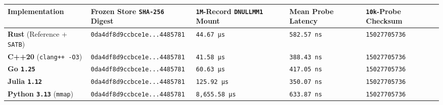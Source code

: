 \documentclass[10pt,letterpaper]{article}
\newcounter{none}
\begin{document}
{\def\LTcaptype{none} %
{\footnotesize\setlength{\tabcolsep}{3.8pt}\renewcommand{\arraystretch}{1.15}
\begin{longtable}[]{@{}
  >{\raggedright\arraybackslash}p{}
  >{\raggedright\arraybackslash}p{}
  >{\raggedleft\arraybackslash}p{}
  >{\raggedleft\arraybackslash}p{}
  >{\raggedleft\arraybackslash}p{}@{}}
\toprule\noalign{}
\begin{minipage}[b]{\linewidth}\raggedright
\textbf{Implementation}
\end{minipage} & \begin{minipage}[b]{\linewidth}\raggedright
\textbf{Frozen Store \texttt{SHA-256} Digest}
\end{minipage} & \begin{minipage}[b]{\linewidth}\raggedleft
\textbf{\texttt{1M}-Record \texttt{DNULLMM1} Mount}
\end{minipage} & \begin{minipage}[b]{\linewidth}\raggedleft
\textbf{Mean Probe Latency}
\end{minipage} & \begin{minipage}[b]{\linewidth}\raggedleft
\textbf{\texttt{10k}-Probe Checksum}
\end{minipage} \\
\midrule\noalign{}
\endhead
\bottomrule\noalign{}
\endlastfoot
\textbf{Rust} (Reference + \texttt{SATB}) &
\texttt{0da4df8d\allowbreak{}9ccbce1e.\allowbreak{}.\allowbreak{}.\allowbreak{}4485781} & \texttt{44.67\ µs} &
\texttt{582.\allowbreak{}57\ ns} & \texttt{15027705736} \\
\textbf{C++20} (\texttt{clang++\ -\allowbreak{}O3}) &
\texttt{0da4df8d\allowbreak{}9ccbce1e.\allowbreak{}.\allowbreak{}.\allowbreak{}4485781} & \texttt{41.58\ µs} &
\texttt{388.\allowbreak{}43\ ns} & \texttt{15027705736} \\
\textbf{Go \texttt{1.25}} & \texttt{0da4df8d\allowbreak{}9ccbce1e.\allowbreak{}.\allowbreak{}.\allowbreak{}4485781} &
\texttt{60.63\ µs} & \texttt{417.\allowbreak{}05\ ns} & \texttt{15027705736} \\
\textbf{Julia \texttt{1.12}} & \texttt{0da4df8d\allowbreak{}9ccbce1e.\allowbreak{}.\allowbreak{}.\allowbreak{}4485781} &
\texttt{125.\allowbreak{}92\ µs} & \texttt{350.\allowbreak{}07\ ns} & \texttt{15027705736} \\
\textbf{Python \texttt{3.13}} (\texttt{mmap}) &
\texttt{0da4df8d\allowbreak{}9ccbce1e.\allowbreak{}.\allowbreak{}.\allowbreak{}4485781} & \texttt{8,\allowbreak{}655.\allowbreak{}58\ µs} &
\texttt{633.\allowbreak{}87\ ns} & \texttt{15027705736} \\
\end{longtable}
}
}
\end{document}
